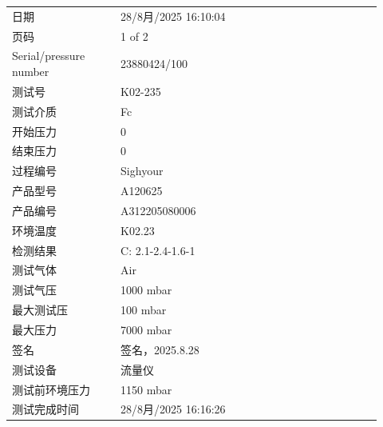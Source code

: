 \documentclass[UTF8,10pt,a4paper,fontset=fandol]{ctexart}
\newcommand{\fieldvalue}[1]{#1}
\newcommand{\handwritten}[1]{#1}
\begin{document}
\begin{tabular}{@{}p{0.27\linewidth}p{0.65\linewidth}@{}}
日期 &
\fieldvalue{28/8月/2025 16:10:04}
\\
页码 &
\fieldvalue{1 of 2}
\\
Serial/pressure number &
\fieldvalue{23880424/100}
\\
测试号 &
\fieldvalue{K02-235}
\\
测试介质 &
\fieldvalue{Fc}
\\
开始压力 &
\fieldvalue{0}
\\
结束压力 &
\fieldvalue{0}
\\
过程编号 &
\fieldvalue{Sighyour}
\\
产品型号 &
\fieldvalue{A120625}
\\
产品编号 &
\fieldvalue{A312205080006}
\\
环境温度 &
\fieldvalue{K02.23}
\\
检测结果 &
\fieldvalue{C: 2.1-2.4-1.6-1}
\\
测试气体 &
\fieldvalue{Air}
\\
测试气压 &
\fieldvalue{1000 mbar}
\\
最大测试压 &
\fieldvalue{100 mbar}
\\
最大压力 &
\fieldvalue{7000 mbar}
\\
签名 &
\fieldvalue{\handwritten{签名，2025.8.28}}
\\
测试设备 &
\fieldvalue{流量仪}
\\
测试前环境压力 &
\fieldvalue{1150 mbar}
\\
测试完成时间 &
\fieldvalue{28/8月/2025 16:16:26}
\end{tabular}
\end{document}
